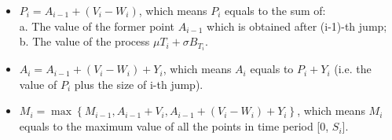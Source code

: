 \begin{enumerate}
    \begin{itemize}
        \item $P_{i}=A_{i-1}+\left(V_{i}-W_{i}\right)$, which means $P_{i}$ equals to the sum of:\\
        a. The value of the former point $A_{i-1}$ which is obtained after (i-1)-th jump;\\
        b. The value of the process $\mu T_{i}+\sigma B_{{T}_{i}}$.
        
        \item $A_{i}=A_{i-1}+\left(V_{i}-W_{i}\right)+Y_{i}$, which means $A_{i}$ equals to $P_{i}+Y_{i}$ (i.e. the value of $P_{i}$ plus the size of i-th jump).
        
        \item $M_{i}=\max \left\{M_{i-1}, A_{i-1}+V_{i}, A_{i-1}+\left(V_{i}-W_{i}\right)+Y_{i}\right\}$, which means $M_{i}$ equals to the maximum value of all the points in time period [0, $S_i$].  
    \end{itemize}{}
    
\end{enumerate}{}







\newpage


